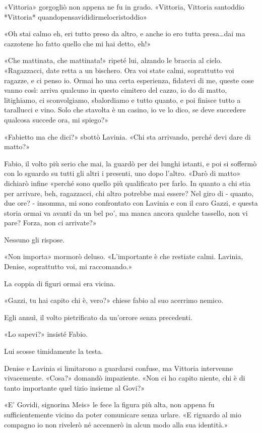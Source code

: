 «Vittoria» gorgogliò non appena ne fu in grado. «Vittoria, Vittoria santoddio *Vittoria* quandopensavididirmelocristoddio»

«Oh stai calmo eh, eri tutto preso da altro, e anche io ero tutta presa\ldots dai ma cazzotene ho fatto quello che mi hai detto, eh!»

«Che mattinata, che mattinata!» ripeté lui, alzando le braccia al cielo. «Ragazzacci, date retta a un bischero. Ora voi state calmi, soprattutto voi ragazze, e ci penso io. Ormai ho una certa esperienza, fidatevi di me, queste cose vanno così: arriva qualcuno in questo cimitero del cazzo, io do di matto, litighiamo, ci sconvolgiamo, sbalordiamo e tutto quanto, e poi finisce tutto a tarallucci e vino. Solo che stavolta è un casino, io ve lo dico, se deve succedere qualcosa succede ora, mi spiego?»

«Fabietto ma che dici?» sbottò Lavinia. «Chi sta arrivando, perché devi dare di matto?»

Fabio, il volto più serio che mai, la guardò per dei lunghi istanti, e poi si soffermò con lo sguardo su tutti gli altri i presenti, uno dopo l'altro. «Darò di matto» dichiarò infine «perché sono quello più qualificato per farlo. In quanto a chi stia per arrivare, beh, ragazzacci, chi altro potrebbe mai essere? Nel giro di - quanto, due ore? - insomma, mi sono confrontato con Lavinia e con il caro Gazzi, e questa storia ormai va avanti da un bel po', ma manca ancora qualche tassello, non vi pare? Forza, non ci arrivate?»

Nessuno gli rispose.

«Non importa» mormorò deluso. «L'importante è che restiate calmi. Lavinia, Denise, soprattutto voi, mi raccomando.»

La coppia di figuri ormai era vicina.

«Gazzi, tu hai capito chi è, vero?» chiese fabio al suo acerrimo nemico. 

Egli annuì, il volto pietrificato da un'orrore senza precedenti.

«Lo sapevi?» insisté Fabio.

Lui scosse timidamente la testa.

Denise e Lavinia si limitarono a guardarsi confuse, ma Vittoria intervenne vivacemente. «Cosa?» domandò impaziente. «Non ci ho capito niente, chi è di tanto importante quel tizio insieme al Govi?»

«E' Govidi, signorina Meis» le fece la figura più alta, non appena fu sufficientemente vicino da poter comunicare senza urlare. «E riguardo al mio compagno io non rivelerò né accennerò in alcun modo alla sua identità.»


